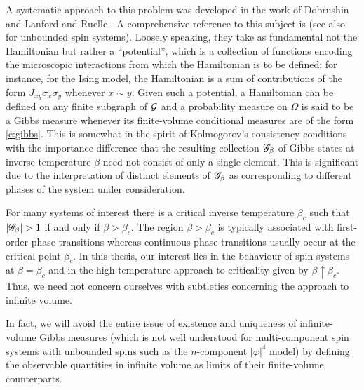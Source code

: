 A systematic approach to this problem was developed in the work of Dobrushin \cite{Dobrushin68}
and Lanford and Ruelle \cite{LR69}. A comprehensive reference to this subject is \cite{Georgii11}
(see also \cite{LP76} for unbounded spin systems).
Loosely speaking, they take as fundamental not the Hamiltonian
but rather a ``potential'', which is a collection of functions encoding the microscopic interactions
from which the Hamiltonian is to be defined; for instance, for the Ising model,
the Hamiltonian is a sum of contributions of the form $J_{xy} \sigma_x \sigma_y$ whenever
$x \sim y$. Given such a potential, a Hamiltonian can be defined on any
finite subgraph of $\mathcal{G}$ and a probability measure on $\Omega$ is said to be a Gibbs
measure whenever its finite-volume conditional measures are of the form \eqref{e:gibbs}.
This is somewhat in the spirit of Kolmogorov's consistency conditions with the importance
difference that the resulting collection $\mathscr{G}_\beta$ of Gibbs states at inverse temperature
$\beta$ need not consist of only a single element. This is significant due to the interpretation
of distinct elements of $\mathscr{G}_\beta$ as corresponding to different phases of the system under
consideration.

For many systems of interest there is a critical inverse temperature $\beta_c$ such that
$|\mathscr{G}_\beta| > 1$ if and only if $\beta > \beta_c$. The region $\beta > \beta_c$ is typically
associated with first-order phase transitions whereas continuous phase transitions usually occur
at the critical point $\beta_c$.
In this thesis, our interest lies in the behaviour of spin systems at $\beta = \beta_c$ and in the
high-temperature approach to criticality given by $\beta \uparrow \beta_c$.
Thus, we need not concern ourselves with subtleties concerning the approach to infinite volume.

In fact, we will avoid the entire issue of existence and uniqueness of infinite-volume Gibbs
measures (which is not well understood for multi-component spin systems with unbounded spins
such as the $n$-component $|\varphi|^4$ model) by defining the observable quantities in infinite
volume as limits of their finite-volume counterparts.


